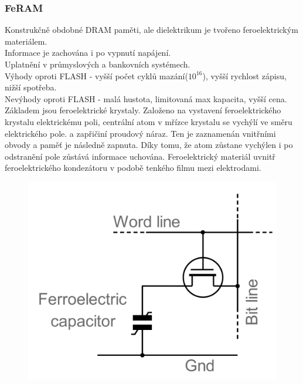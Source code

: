 \subsubsection*{FeRAM}
Konstrukčně obdobné DRAM paměti, ale dielektrikum je tvořeno feroelektrickým materiálem.\\
Informace je zachována i po vypnutí napájení.\\
Uplatnění v průmyslových a bankovních systémech.\\
Výhody oproti FLASH - vyšší počet cyklů mazání(\(10^{16}\)), vyšší rychlost zápisu, nižší spotřeba.\\
Nevýhody oproti FLASH - malá hustota, limitovaná max kapacita, vyšší cena.
Základem jsou feroelektrické krystaly. Založeno na vystavení feroelektrického krystalu elektrickému poli, centrální atom v mřízce krystalu se vychýlí ve směru elektrického pole. a zapřičiní proudový náraz. Ten je zaznamenán vnitřními obvody a paměť je následně zapnuta. Díky tomu, že atom zůstane vychýlen i po odstranění pole zůstává informace uchována.
Feroelektrický materiál uvnitř feroelektrického kondezátoru v podobě tenkého filmu mezi elektrodami.
\begin{figure} [h!]
    \centering
    \includegraphics*[scale = 0.3]{img/FeRAM.png}
\end{figure}

